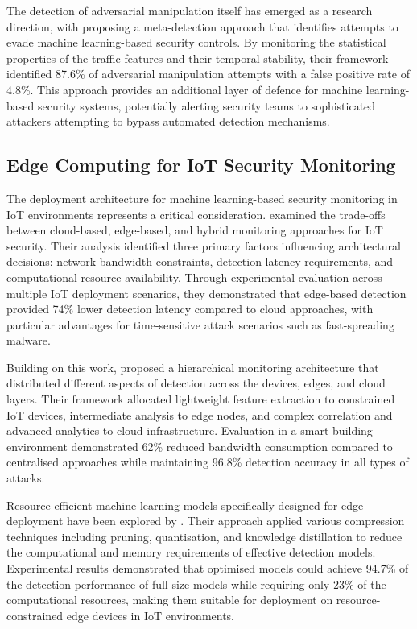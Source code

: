 The detection of adversarial manipulation itself has emerged as a research direction, with \cite{Pawlicki2020} proposing a meta-detection approach that identifies attempts to evade machine learning-based security controls. By monitoring the statistical properties of the traffic features and their temporal stability, their framework identified 87.6\% of adversarial manipulation attempts with a false positive rate of 4.8\%. This approach provides an additional layer of defence for machine learning-based security systems, potentially alerting security teams to sophisticated attackers attempting to bypass automated detection mechanisms.

\subsection{Edge Computing for IoT Security Monitoring}

The deployment architecture for machine learning-based security monitoring in IoT environments represents a critical consideration. \cite{Pajouh2018} examined the trade-offs between cloud-based, edge-based, and hybrid monitoring approaches for IoT security. Their analysis identified three primary factors influencing architectural decisions: network bandwidth constraints, detection latency requirements, and computational resource availability. Through experimental evaluation across multiple IoT deployment scenarios, they demonstrated that edge-based detection provided 74\% lower detection latency compared to cloud approaches, with particular advantages for time-sensitive attack scenarios such as fast-spreading malware.

Building on this work, \cite{Mishra2020} proposed a hierarchical monitoring architecture that distributed different aspects of detection across the devices, edges, and cloud layers. Their framework allocated lightweight feature extraction to constrained IoT devices, intermediate analysis to edge nodes, and complex correlation and advanced analytics to cloud infrastructure. Evaluation in a smart building environment demonstrated 62\% reduced bandwidth consumption compared to centralised approaches while maintaining 96.8\% detection accuracy in all types of attacks.

Resource-efficient machine learning models specifically designed for edge deployment have been explored by \cite{Li2019}. Their approach applied various compression techniques including pruning, quantisation, and knowledge distillation to reduce the computational and memory requirements of effective detection models. Experimental results demonstrated that optimised models could achieve 94.7\% of the detection performance of full-size models while requiring only 23\% of the computational resources, making them suitable for deployment on resource-constrained edge devices in IoT environments.

